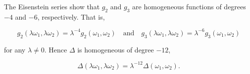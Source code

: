 The Eisenstein series show that $g_2$ and $g_3$ are homogeneous functions of degrees $-4$ and $-6$, respectively. That is,

$$g_2(\lambda\omega_1, \lambda\omega_2) = \lambda^{-4}g_2(\omega_1, \omega_2) \quad \text{and} \quad g_3(\lambda\omega_1, \lambda\omega_2) = \lambda^{-6}g_3(\omega_1, \omega_2)$$

for any $\lambda \neq 0$. Hence $\Delta$ is homogeneous of degree $-12$,

$$\Delta(\lambda\omega_1, \lambda\omega_2) = \lambda^{-12}\Delta(\omega_1, \omega_2).$$
